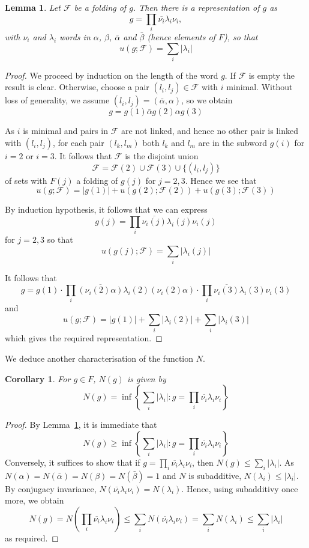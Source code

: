 \documentclass{amsart}
\theoremstyle{plain}
\newtheorem{lemma}[theorem]{Lemma}
\newtheorem{corollary}[theorem]{Corollary}
\theoremstyle{definition}
\theoremstyle{remark}
\newcommand{\F}{\mathcal{F}}
\renewcommand{\a}{\alpha}
\renewcommand{\b}{\beta}
\newcommand{\ba}{\bar{\alpha}}
\newcommand{\bb}{\bar{\beta}}
\begin{document}
\begin{lemma}\label{prodconj}
Let $\F$ be a folding of $g$. Then there is a representation of $g$ as 
$$g=\prod_i \overline{\nu_i}\lambda_i\nu_i,$$
with $\nu_i$ and $\lambda_i$ words in $\a$, $\b$, $\ba$ and $\bb$ (hence elements of $F$), so that  
$$u(g;\F)=\sum_i \vert \lambda_i\vert$$
\end{lemma}
\begin{proof}
We proceed by induction on the length of the word $g$. If $\F$ is empty the result is clear. Otherwise, choose a pair  $(l_i,l_j)\in\F$ with $i$ minimal. Without loss of generality, we assume $(l_i,l_j)=(\ba,\a)$, so we obtain
$$g=g(1)\ba g(2)\a g(3)$$

As $i$ is minimal and pairs in $\F$ are not linked, and hence no other pair is linked with $(l_i,l_j)$, for each pair $(l_k,l_m)$ both $l_k$ and $l_m$ are in the subword $g(i)$ for  $i=2$ or $i=3$.  It follows that $\F$ is the disjoint union
$$\F=\F(2)\cup \F(3)\cup \{(l_i,l_j)\}$$
of sets with $F(j)$ a folding of $g(j)$ for $j=2,3$. Hence we see that
$$u(g;\F)=\vert g(1)\vert+ u(g(2);\F(2))+u(g(3);\F(3))$$

By induction hypothesis, it follows that we can express 
$$g(j)=\prod_i \overline{\nu_i(j)}\lambda_i(j)\nu_i(j)$$ for $j=2,3$
so that 
$$u(g(j);\F)=\sum_i \vert \lambda_i(j)\vert$$

It follows that
$$g=g(1)\cdot
\prod_i \overline{( \nu_i(2)\a)}\lambda_i(2)(\nu_i(2)\a)
\cdot \prod_i \overline{\nu_i(3)}\lambda_i(3)\nu_i(3)$$
and 
$$u(g;\F)=\vert g(1)\vert+\sum_i \vert \lambda_i(2)\vert+\sum_i \vert \lambda_i(3)\vert$$
which gives the required representation.
\end{proof}

We deduce another characterisation of the function $N$.

\begin{corollary}
For $g\in F$, $N(g)$ is given by 
$$N(g)=\inf\left\{\sum_i \vert \lambda_i\vert: g=\prod_i \overline{\nu_i}\lambda_i\nu_i\right\}$$
\end{corollary}
\begin{proof}
By Lemma~\ref{prodconj}, it is immediate that 
$$N(g)\geq \inf\left\{\sum_i \vert \lambda_i\vert: g=\prod_i \overline{\nu_i}\lambda_i\nu_i\right\}$$
Conversely, it suffices to show that if $g=\prod_i \overline{\nu_i}\lambda_i\nu_i$, then $N(g)\leq \sum_i\vert\lambda_i\vert$. As $N(\a)=N(\ba)=N(\b)=N(\bb)=1$ and $N$ is subadditive, $N(\lambda_i)\leq \vert\lambda_i\vert$. By conjugacy invariance, $N(\overline{\nu_i}\lambda_i\nu_i)=N(\lambda_i)$. Hence, using subadditivy once more, we obtain
$$N(g)=N(\prod_i \overline{\nu_i}\lambda_i\nu_i)\leq \sum_i N(\overline{\nu_i}\lambda_i\nu_i)= \sum_i N(\lambda_i)
\leq\sum_i\vert\lambda_i\vert$$
as required.
\end{proof}
\end{document}
